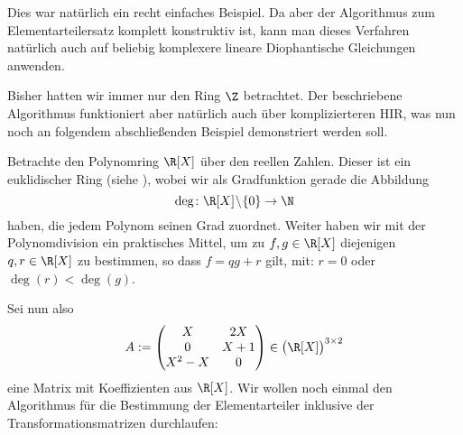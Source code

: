 Dies war natürlich ein recht einfaches Beispiel. Da aber der Algorithmus zum
Elementarteilersatz komplett konstruktiv ist, kann man dieses Verfahren
natürlich auch auf beliebig komplexere lineare Diophantische Gleichungen
anwenden.

Bisher hatten wir immer nur den Ring $\Z$ betrachtet. Der beschriebene
Algorithmus funktioniert aber natürlich auch über komplizierteren HIR, was nun
noch an folgendem abschließenden Beispiel demonstriert werden soll.

\begin{thBeisp}\label{bsp:polyring}
    Betrachte den Polynomring $\R[X]$ über den reellen Zahlen. Dieser ist ein
    euklidischer Ring (siehe \cite[??]{talk:rief}),
    wobei wir als Gradfunktion gerade die Abbildung \vspace*{-7pt}
    \[ \deg\colon\R[X]\!\setminus\!\{0\}\to\N       \vspace*{-7pt}   \] 
    haben, die jedem Polynom seinen Grad zuordnet. Weiter haben wir mit der
    Polynomdivision ein praktisches Mittel, um zu $f,g\in\R[X]$ diejenigen
    $q,r\in\R[X]$ zu bestimmen, so dass $f = qg+r$ gilt, mit: $r=0$ oder
    $\deg(r)<\deg(g)$.
    
    Sei nun also
    \[ A := \Matrix{ X      &  2X   \\
                     0      &  X+1  \\
                     X^2-X  &  0     }  
    \in \bigl(\R[X]\bigr)^{3\times2}
    \]
    eine Matrix mit Koeffizienten aus $\R[X]$. Wir wollen noch einmal den
    Algorithmus für die Bestimmung der Elementarteiler inklusive der
    Transformationsmatrizen durchlaufen:
    

\end{thBeisp}
